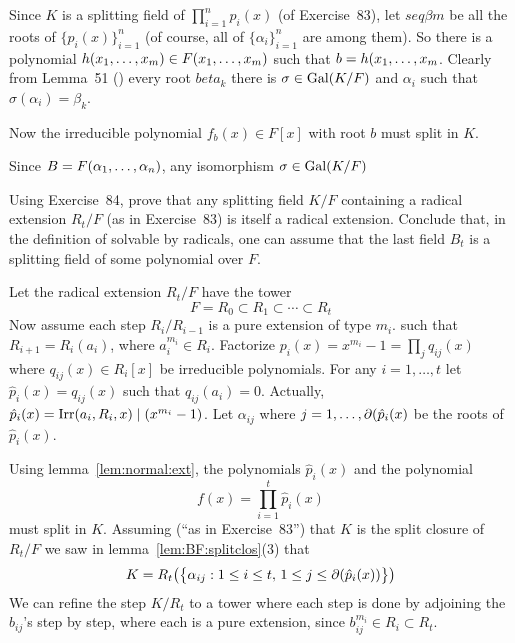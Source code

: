 \begin{myenumerate}
\begin{itemize}
   Since $K$ is a splitting field of \(\prod_{i=1}^n p_i(x)\)
   (of Exercise~83), let \(seq{\beta}{m}\) be all the roots
   of \(\{p_i(x)\}_{i=1}^n\) (of course, all of \(\{\alpha_i\}_{i=1}^n\) are
   among them).
   So there is a polynomial \(h(x_1,\ldots,x_{m}) \in F(x_1,\ldots,x_{m})\)
   such that \(b=h(x_1,\ldots,x_{m}\). Clearly from Lemma~51 (\cite{Rotman98})
   every root \(beta_k\)
   there is \(\sigma\in \mathop{\rm Gal}\nolimits(K/F)\) and \(\alpha_i\) such that
   \(\sigma(\alpha_i)=\beta_k\).

   Now the irreducible polynomial
   \(f_b(x)\in F[x]\) with root $b$ must split in $K$.


   Since \(B=F(\alpha_1,\ldots,\alpha_{n})\), any isomorphism \(\sigma\in \mathop{\rm Gal}\nolimits(K/F)\)

 \fi

\end{itemize}

\item
\begin{excopy}
Using Exercise~84, prove that any splitting field \(K/F\) containing a radical
extension \(R_t/F\) (as in Exercise~83) is itself a radical extension.
Conclude that, in the definition of solvable by radicals, one can assume
that the last field \(B_t\) is a splitting field of some polynomial over $F$.
\end{excopy}

Let the radical extension \(R_t/F\) have the tower
\begin{equation*}
 F = R_0 \subset R_1 \subset \cdots \subset R_t
\end{equation*}
Now assume each step \(R_{i}/R_{i-1}\) is a pure extension of type \(m_i\).
such that \(R_{i+1}=R_i(a_i)\), where \(a_i^{m_i}\in R_i\).
Factorize \(p_i(x) = x^{m_i} - 1 =\prod_j q_{ij}(x)\)
where \(q_{ij}(x) \in R_i[x]\) be irreducible polynomials.
For any \(i=1,\ldots,t\) let \(\hat{p}_i(x)=q_{ij}(x)\) such that
\(q_{ij}(a_i) = 0\).
Actually, \(\hat{p}_i(x) = \mathop{\rm Irr}\nolimits(a_i,R_i,x) \mid (x^{m_i}-1)\).
Let \(\alpha_{ij}\) where \(j=1,\ldots,\partial(\hat{p}_i(x)\)
be the roots of \(\hat{p}_i(x)\).

Using lemma~\ref{lem:normal:ext}, the polynomials \(\hat{p}_i(x)\)
and the polynomial
\begin{equation*}
 f(x) = \prod_{i=1}^t \hat{p}_i(x)
\end{equation*}
must split in $K$.
Assuming (``as in Exercise~83'') that $K$ is the split closure of \(R_t/F\)
we saw in lemma~\ref{lem:BF:splitclos}(3)
that
\begin{equation*}
 K = R_t\bigl(\bigl\{\alpha_{ij}: 1\leq i\leq t,
                             \, 1\leq j\leq \partial(\hat{p}_i(x))\bigr\}\bigr)
\end{equation*}
We can refine the step \(K/R_t\) to a tower where each step is
done by adjoining the \(b_{ij}\)'s step by step,
where each is a pure extension, since \(b_{ij}^{m_i} \in R_i \subset R_t\).

\end{myenumerate}


